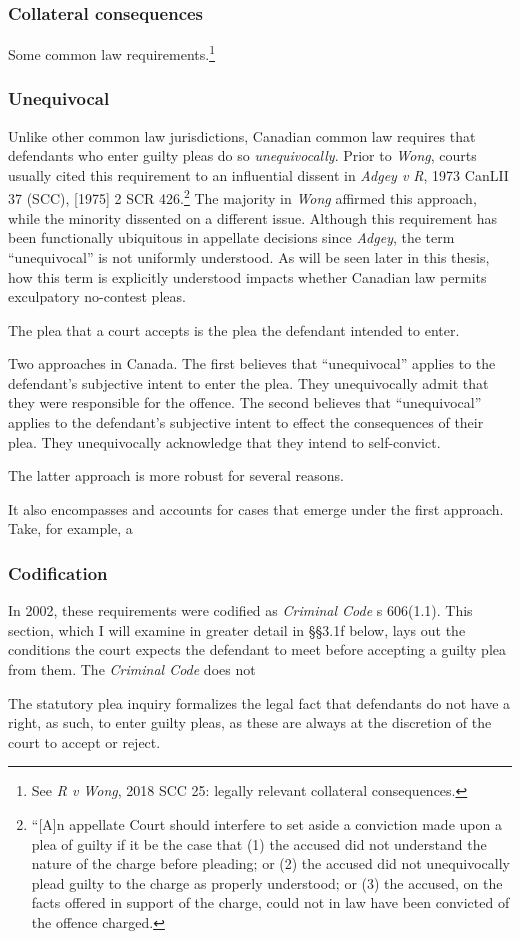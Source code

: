 \subsubsection{Collateral consequences}



Some common law requirements.\footnote{See \textit{R v Wong}, 2018 SCC 25: legally relevant collateral consequences.}

\subsubsection{Unequivocal}

Unlike other common law jurisdictions, Canadian common law requires that defendants who enter guilty pleas do so \textit{unequivocally}. Prior to \textit{Wong}, courts usually cited this requirement to an influential dissent in \textit{Adgey v R}, 1973 CanLII 37 (SCC), [1975] 2 SCR 426.\footnote{``[A]n appellate Court should interfere to set aside a conviction made upon a plea of guilty if it be the case that (1) the accused did not understand the nature of the charge before pleading; or (2) the accused did not unequivocally plead guilty to the charge as properly understood; or (3) the accused, on the facts offered in support of the charge, could not in law have been convicted of the offence charged.} The majority in \textit{Wong} affirmed this approach, while the minority dissented on a different issue. Although this requirement has been functionally ubiquitous in appellate decisions since \textit{Adgey}, the term ``unequivocal'' is not uniformly understood. As will be seen later in this thesis, how this term is explicitly understood impacts whether Canadian law permits exculpatory no-contest pleas.

The plea that a court accepts is the plea the defendant intended to enter.


Two approaches in Canada. The first believes that ``unequivocal'' applies to the defendant's subjective intent to enter the plea. They unequivocally admit that they were responsible for the offence. The second believes that ``unequivocal'' applies to the defendant's subjective intent to effect the consequences of their plea. They unequivocally acknowledge that they intend to self-convict.

The latter approach is more robust for several reasons. 

It also encompasses and accounts for cases that emerge under the first approach. Take, for example, a

\subsubsection{Codification}

In 2002, these requirements were codified as \textit{Criminal Code} s 606(1.1). This section, which I will examine in greater detail in §§3.1f below, lays out the conditions the court expects the defendant to meet before accepting a guilty plea from them. The \textit{Criminal Code} does not 

The statutory plea inquiry formalizes the legal fact that defendants do not have a right, as such, to enter guilty pleas, as these are always at the discretion of the court to accept or reject.
